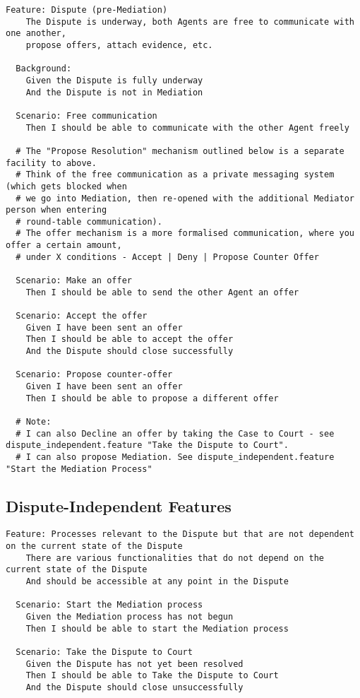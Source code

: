 \begin{lstlisting}
Feature: Dispute (pre-Mediation)
    The Dispute is underway, both Agents are free to communicate with one another,
    propose offers, attach evidence, etc.
  
  Background:
    Given the Dispute is fully underway
    And the Dispute is not in Mediation

  Scenario: Free communication
    Then I should be able to communicate with the other Agent freely

  # The "Propose Resolution" mechanism outlined below is a separate facility to above.
  # Think of the free communication as a private messaging system (which gets blocked when
  # we go into Mediation, then re-opened with the additional Mediator person when entering
  # round-table communication).
  # The offer mechanism is a more formalised communication, where you offer a certain amount,
  # under X conditions - Accept | Deny | Propose Counter Offer

  Scenario: Make an offer
    Then I should be able to send the other Agent an offer

  Scenario: Accept the offer
    Given I have been sent an offer
    Then I should be able to accept the offer
    And the Dispute should close successfully

  Scenario: Propose counter-offer
    Given I have been sent an offer
    Then I should be able to propose a different offer

  # Note:
  # I can also Decline an offer by taking the Case to Court - see dispute_independent.feature "Take the Dispute to Court".
  # I can also propose Mediation. See dispute_independent.feature "Start the Mediation Process"
\end{lstlisting}

\subsection{Dispute-Independent Features}

\begin{lstlisting}
Feature: Processes relevant to the Dispute but that are not dependent on the current state of the Dispute
    There are various functionalities that do not depend on the current state of the Dispute
    And should be accessible at any point in the Dispute

  Scenario: Start the Mediation process
    Given the Mediation process has not begun
    Then I should be able to start the Mediation process

  Scenario: Take the Dispute to Court
    Given the Dispute has not yet been resolved
    Then I should be able to Take the Dispute to Court
    And the Dispute should close unsuccessfully
\end{lstlisting}

